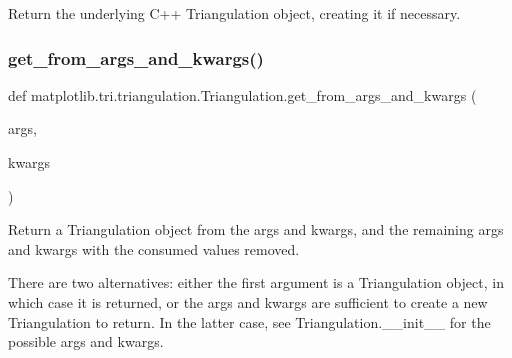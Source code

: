 \begin{DoxyVerb}Return the underlying C++ Triangulation object, creating it
if necessary.
\end{DoxyVerb}
 \mbox{\label{classmatplotlib_1_1tri_1_1triangulation_1_1Triangulation_a74e48fb0dcec489c4f98d3715fd5cb00}} 
\subsubsection{\texorpdfstring{get\+\_\+from\+\_\+args\+\_\+and\+\_\+kwargs()}{get\_from\_args\_and\_kwargs()}}
{\footnotesize\ttfamily def matplotlib.\+tri.\+triangulation.\+Triangulation.\+get\+\_\+from\+\_\+args\+\_\+and\+\_\+kwargs (\begin{DoxyParamCaption}\item[{}]{args,  }\item[{}]{kwargs }\end{DoxyParamCaption})\hspace{0.3cm}{\ttfamily [static]}}

\begin{DoxyVerb}Return a Triangulation object from the args and kwargs, and
the remaining args and kwargs with the consumed values removed.

There are two alternatives: either the first argument is a
Triangulation object, in which case it is returned, or the args
and kwargs are sufficient to create a new Triangulation to
return.  In the latter case, see Triangulation.__init__ for
the possible args and kwargs.
\end{DoxyVerb}
 \mbox{\label{classmatplotlib_1_1tri_1_1triangulation_1_1Triangulation_a7814c6541d4d51619ba1276c564041aa}} 
